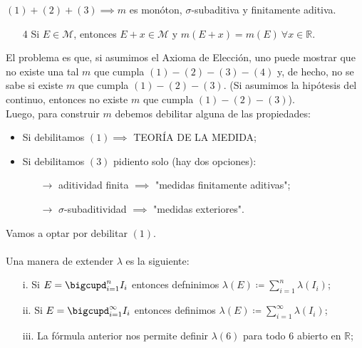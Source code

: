 \documentclass[11pt]{article}
\theoremstyle{definition} %
\newcommand{\R}{\mathbb{R}}
\begin{document}
\begin{property}
	\begin{ex}
		$(1)+(2)+(3) \implies m$ es monóton, $\sigma$-subaditiva y finitamente aditiva. 
	\end{ex}

	\begin{enumerate}
		\item[4] Si $E \in \mathcal{M}$, entonces $E + x \in \mathcal{M}$ y $m(E + x) = m(E)\ \forall x \in \R$.
	\end{enumerate}

	\noindent El problema es que, si asumimos el Axioma de Elección, uno puede mostrar que no existe una tal $m$ que cumpla $(1)-(2)-(3)-(4)$ y, de hecho, no se sabe si existe $m$ que cumpla $(1)-(2)-(3)$. (Si asumimos la hipótesis del continuo, entonces no existe $m$ que cumpla $(1)-(2)-(3)$). \\

	\noindent Luego, para construir $m$ debemos debilitar alguna de las propiedades:
	\begin{itemize}
		\item Si debilitamos $(1) \implies$ TEORÍA DE LA MEDIDA;
		
		\item Si debilitamos $(3)$ pidiento solo (hay dos opciones):

		\begin{itemize}
			\item[$\rightarrow$] aditividad finita $ \implies$ "medidas finitamente aditivas";
		
			\item[$\rightarrow$] $\sigma$-subaditividad $\implies$ "medidas exteriores".
		\end{itemize}
	\end{itemize}

	\noindent Vamos a optar por debilitar $(1)$. \\\\
	\noindent Una manera de extender $\lambda$ es la siguiente:
	\begin{enumerate}
		\item[i.] Si $E = \displaystyle\bigcupd_{i=1}^{n} I_i$ entonces defninimos $\lambda(E) \coloneq \sum_{i=1}^{n} \lambda (I_i)$;

		\item[ii.] Si $E = \displaystyle\bigcupd_{i=1}^{\infty} I_i$ entonces definimos $\lambda(E) \coloneq \sum_{i=1}^{\infty} \lambda (I_i)$;

		\item[iii.] La fórmula anterior nos permite definir $\lambda (6)$ para todo $6$ abierto en $\R$;


\end{enumerate}
\end{property}
\end{document}
